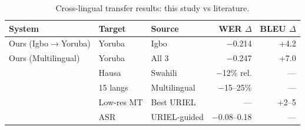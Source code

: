 
\begin{table}[t]
\centering
\small
\caption{Cross-lingual transfer results: this study vs literature.}
\label{tab:p5_sota}
\begin{tabular}{lllrr}
\toprule
\textbf{System} & \textbf{Target} & \textbf{Source} & \textbf{WER $\Delta$} & \textbf{BLEU $\Delta$} \\
\midrule
Ours (Igbo$\to$Yoruba) & Yoruba & Igbo & $-$0.214 & +4.2 \\
Ours (Multilingual) & Yoruba & All 3 & $-$0.247 & +7.0 \\
\midrule
\citet{adams2019massively} & Hausa & Swahili & $-$12\% rel. & — \\
\citet{li2020multilingual} & 15 langs & Multilingual & $-$15–25\% & — \\
\citet{lin2019choosing} & Low-res MT & Best URIEL & — & +2–5 \\
\citet{dalmia2021searchable} & ASR & URIEL-guided & $-$0.08–0.18 & — \\
\bottomrule
\end{tabular}
\end{table}
